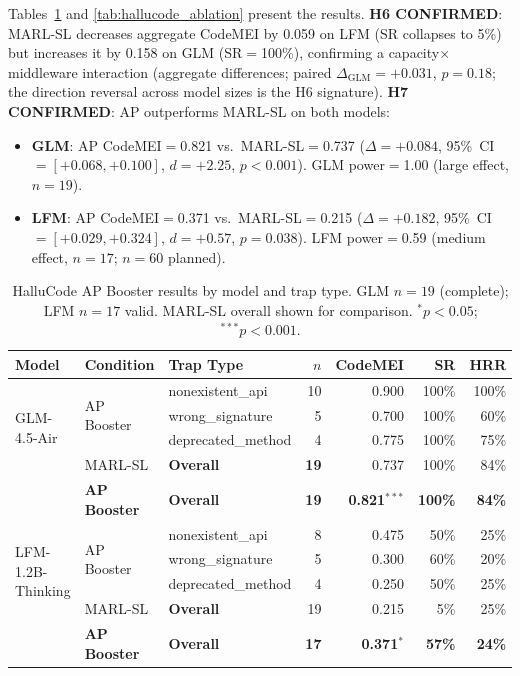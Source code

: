 \documentclass{article}
\begin{document}
Tables~\ref{tab:hallucode} and \ref{tab:hallucode_ablation} present the results.
\textbf{H6 CONFIRMED}: MARL-SL decreases aggregate CodeMEI by 0.059 on LFM (SR collapses to 5\%) but increases it by 0.158 on GLM (SR$=$100\%), confirming a capacity$\times$middleware interaction (aggregate differences; paired $\Delta_{\text{GLM}}{=}+0.031$, $p{=}0.18$; the direction reversal across model sizes is the H6 signature).
\textbf{H7 CONFIRMED}: AP outperforms MARL-SL on both models:
\begin{itemize}[nosep]
  \item \textbf{GLM}: AP CodeMEI$=$0.821 vs.\ MARL-SL$=$0.737 ($\Delta{=}+0.084$, 95\%~CI$=[+0.068,+0.100]$, $d{=}+2.25$, $p{<}0.001$). GLM power$=$1.00 (large effect, $n{=}19$).
  \item \textbf{LFM}: AP CodeMEI$=$0.371 vs.\ MARL-SL$=$0.215 ($\Delta{=}+0.182$, 95\%~CI$=[+0.029,+0.324]$, $d{=}+0.57$, $p{=}0.038$). LFM power$=$0.59 (medium effect, $n{=}17$; $n{=}60$ planned).
\end{itemize}

\begin{table}[h]
\centering
\caption{HalluCode AP Booster results by model and trap type. GLM $n{=}19$ (complete); LFM $n{=}17$ valid. MARL-SL overall shown for comparison. $^*p{<}0.05$; $^{***}p{<}0.001$.}
\label{tab:hallucode}
\small
\begin{tabular}{lllrrrr}
\toprule
Model & Condition & Trap Type & $n$ & CodeMEI & SR & HRR \\
\midrule
\multirow{4}{*}{GLM-4.5-Air} & \multirow{3}{*}{AP Booster} & nonexistent\_api & 10 & 0.900 & 100\% & 100\% \\
 & & wrong\_signature & 5 & 0.700 & 100\% & 60\% \\
 & & deprecated\_method & 4 & 0.775 & 100\% & 75\% \\
 & MARL-SL & \textbf{Overall} & \textbf{19} & 0.737 & 100\% & 84\% \\
 & \textbf{AP Booster} & \textbf{Overall} & \textbf{19} & \textbf{0.821}$^{***}$ & \textbf{100\%} & \textbf{84\%} \\
\midrule
\multirow{4}{*}{LFM-1.2B-Thinking} & \multirow{3}{*}{AP Booster} & nonexistent\_api & 8 & 0.475 & 50\% & 25\% \\
 & & wrong\_signature & 5 & 0.300 & 60\% & 20\% \\
 & & deprecated\_method & 4 & 0.250 & 50\% & 25\% \\
 & MARL-SL & \textbf{Overall} & 19 & 0.215 & 5\% & 25\% \\
 & \textbf{AP Booster} & \textbf{Overall} & \textbf{17} & \textbf{0.371}$^*$ & \textbf{57\%} & \textbf{24\%} \\
\bottomrule
\end{tabular}
\end{table}
\end{document}

